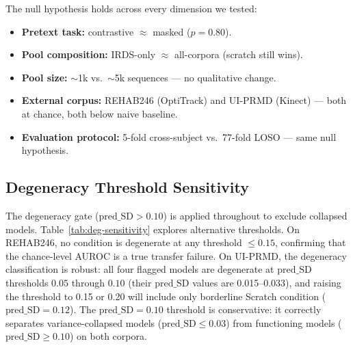 \documentclass[10pt,journal]{IEEEtran}
\begin{document}
The null hypothesis holds across every dimension we tested:
\begin{itemize}
    \item \textbf{Pretext task:} contrastive $\approx$ masked ($p = 0.80$).
    \item \textbf{Pool composition:} IRDS-only $\approx$ all-corpora (scratch still wins).
    \item \textbf{Pool size:} $\sim$1k vs.\ $\sim$5k sequences --- no qualitative change.
    \item \textbf{External corpus:} REHAB246 (OptiTrack) and UI-PRMD (Kinect) --- both at chance, both below naive baseline.
    \item \textbf{Evaluation protocol:} 5-fold cross-subject vs.\ 77-fold LOSO --- same null hypothesis.
\end{itemize}

\subsection{Degeneracy Threshold Sensitivity}
\label{sec:deg-sensitivity}

The degeneracy gate ($\text{pred\_SD} > 0.10$) is applied throughout to exclude collapsed models. Table~\ref{tab:deg-sensitivity} explores alternative thresholds. On REHAB246, no condition is degenerate at any threshold $\leq 0.15$, confirming that the chance-level AUROC is a true transfer failure. On UI-PRMD, the degeneracy classification is robust: all four flagged models are degenerate at $\text{pred\_SD}$ thresholds $0.05$ through $0.10$ (their $\text{pred\_SD}$ values are 0.015--0.033), and raising the threshold to 0.15 or 0.20 will include only borderline Scratch condition ($\text{pred\_SD}=0.12$). The $\text{pred\_SD}=0.10$ threshold is conservative: it correctly separates variance-collapsed models ($\text{pred\_SD} \leq 0.03$) from functioning models ($\text{pred\_SD} \geq 0.10$) on both corpora.
\end{document}
